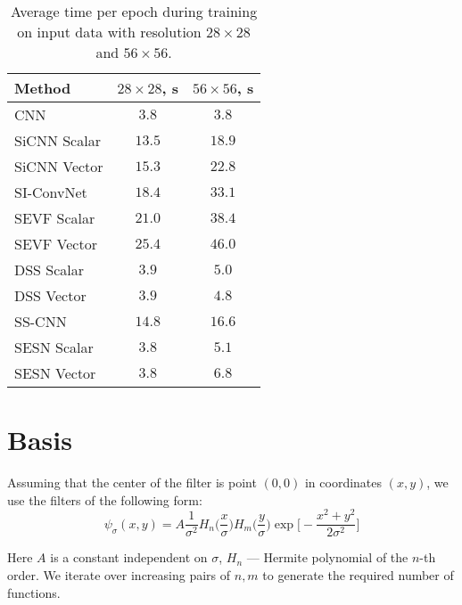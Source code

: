 \documentclass{article} \usepackage{multirow}
\begin{document}
\begin{table}[h]
    \begin{center}
    \begin{tabular}{l|cc}
    \toprule
    Method              & $28\times28$, s           & $56\times56$, s \\ 
    \midrule
    CNN                 & $3.8$                     & $3.8$     \\
    SiCNN Scalar        & $13.5$                    & $18.9$    \\
    SiCNN Vector        & $15.3$                    & $22.8$     \\
    SI-ConvNet          & $18.4$                    & $33.1$     \\
    SEVF Scalar         & $21.0$                    & $38.4$     \\
    SEVF Vector         & $25.4$                    & $46.0$     \\
    DSS Scalar          & $3.9$                     & $5.0$     \\
    DSS Vector          & $3.9$                     & $4.8$     \\
    SS-CNN              & $14.8$                    & $16.6$    \\ 
    \midrule
    SESN Scalar         & $3.8$                     & $5.1$     \\
    SESN Vector         & $3.8$                     & $6.8$    \\
    \bottomrule              
    \end{tabular}
    \end{center}
    \caption{Average time per epoch during training on input data with resolution $28\times28$
    and $56\times56$.}
    \label{tab:appendix_time_performance}
\end{table} 


\section{Basis}
\label{sec:appendix_basis}
Assuming that the center of the filter is point $(0, 0)$ in coordinates $(x, y)$, 
we use the filters of the following form:
\begin{equation}
    \psi_\sigma(x, y) = A\frac{1}{\sigma^2}
    H_n\Big(\frac{x}{\sigma}\Big)
    H_m\Big(\frac{y}{\sigma}\Big)
    \exp\Big[ -\frac{x^2 + y^2}{2\sigma^2}\Big]
\end{equation}

Here $A$ is a constant independent on $\sigma$, $H_n$ --- Hermite polynomial of the $n$-th 
order. We iterate over increasing pairs of $n,m$ to generate the required number of functions.
\end{document}
